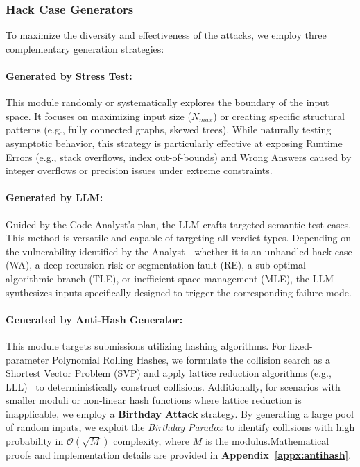\documentclass[11pt]{article}
\begin{document}
\subsubsection{Hack Case Generators}
To maximize the diversity and effectiveness of the attacks, we employ three complementary generation strategies:

\paragraph{Generated by Stress Test:}
This module randomly or systematically explores the boundary of the input space. It focuses on maximizing input size ($N_{max}$) or creating specific structural patterns (e.g., fully connected graphs, skewed trees). While naturally testing asymptotic behavior, this strategy is particularly effective at exposing Runtime Errors (e.g., stack overflows, index out-of-bounds) and Wrong Answers caused by integer overflows or precision issues under extreme constraints.
\vspace{-0.25cm}
\paragraph{Generated by LLM:}
Guided by the Code Analyst's plan, the LLM crafts targeted semantic test cases. This method is versatile and capable of targeting all verdict types. Depending on the vulnerability identified by the Analyst—whether it is an unhandled hack case (WA), a deep recursion risk or segmentation fault (RE), a sub-optimal algorithmic branch (TLE), or inefficient space management (MLE), the LLM synthesizes inputs specifically designed to trigger the corresponding failure mode.
\vspace{-0.25cm}
\paragraph{Generated by Anti-Hash Generator:}
This module targets submissions utilizing hashing algorithms. For fixed-parameter Polynomial Rolling Hashes, we formulate the collision search as a Shortest Vector Problem (SVP) and apply lattice reduction algorithms (e.g., LLL)~\cite{cf_antihash} to deterministically construct collisions. 
Additionally, for scenarios with smaller moduli or non-linear hash functions where lattice reduction is inapplicable, we employ a \textbf{Birthday Attack} strategy. By generating a large pool of random inputs, we exploit the \textit{Birthday Paradox} to identify collisions with high probability in $\mathcal{O}(\sqrt{M})$ complexity, where $M$ is the modulus.Mathematical proofs and implementation details are provided in \textbf{Appendix~\ref{appx:antihash}}.
\end{document}
